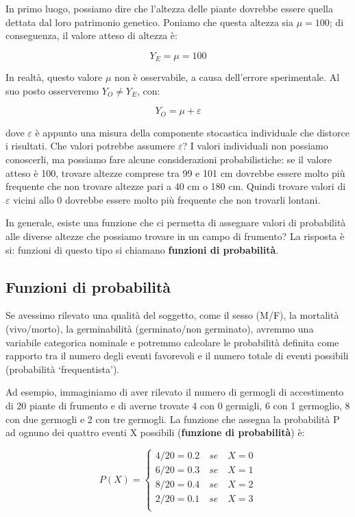 \documentclass[a4paper,12pt,oneside]{book}
\theoremstyle{definition}
\theoremstyle{definition}
\theoremstyle{definition}
\theoremstyle{remark}
\begin{document}
In primo luogo, possiamo dire che l'altezza delle piante dovrebbe essere
quella dettata dal loro patrimonio genetico. Poniamo che questa altezza
sia \(\mu = 100\); di conseguenza, il valore atteso di altezza è:

\[Y_E  = \mu = 100\]

In realtà, questo valore \(\mu\) non è osservabile, a causa dell'errore
sperimentale. Al suo posto osserveremo \(Y_O \neq Y_E\), con:

\[ Y_O = \mu + \varepsilon \]

dove \(\varepsilon\) è appunto una misura della componente stocastica
individuale che distorce i risultati. Che valori potrebbe assumere
\(\varepsilon\)? I valori individuali non possiamo conoscerli, ma
possiamo fare alcune considerazioni probabilistiche: se il valore atteso
è 100, trovare altezze comprese tra 99 e 101 cm dovrebbe essere molto
più frequente che non trovare altezze pari a 40 cm o 180 cm. Quindi
trovare valori di \(\varepsilon\) vicini allo 0 dovrebbe essere molto
più frequente che non trovarli lontani.

In generale, esiste una funzione che ci permetta di assegnare valori di
probabilità alle diverse altezze che possiamo trovare in un campo di
frumento? La risposta è si: funzioni di questo tipo si chiamano
\textbf{funzioni di probabilità}.

\subsection{Funzioni di probabilità}\label{funzioni-di-probabilita}

Se avessimo rilevato una qualità del soggetto, come il sesso (M/F), la
mortalità (vivo/morto), la germinabilità (germinato/non germinato),
avremmo una variabile categorica nominale e potremmo calcolare le
probabilità definita come rapporto tra il numero degli eventi favorevoli
e il numero totale di eventi possibili (probabilità `frequentista').

Ad esempio, immaginiamo di aver rilevato il numero di germogli di
accestimento di 20 piante di frumento e di averne trovate 4 con 0
germigli, 6 con 1 germoglio, 8 con due germogli e 2 con tre germogli. La
funzione che assegna la probabilità P ad ognuno dei quattro eventi X
possibili (\textbf{funzione di probabilità}) è:

\[
P(X) = \left\{ \begin{array}{l}
 4/20 = 0.2 \,\,\,\,\,\,se\,\,\,\,\,\,X = 0 \\ 
 6/20 = 0.3 \,\,\,\,\,\,se\,\,\,\,\,\,X = 1 \\ 
 8/20 = 0.4\,\,\,\,\,\,se\,\,\,\,\,\, X = 2 \\ 
 2/20 = 0.1 \,\,\,\,\,\,se\,\,\,\,\,\,X = 3 \\ 
 \end{array} \right.
\]
\end{document}
